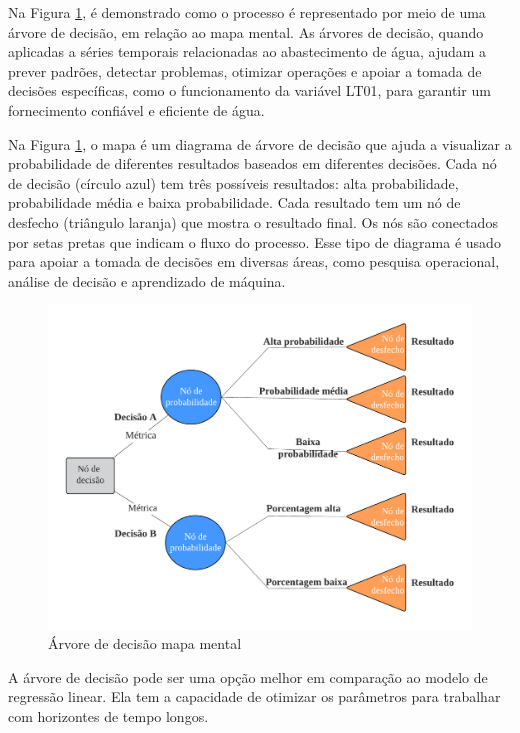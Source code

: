 Na Figura \ref{fig:arvore-de-decisao}, é demonstrado como o processo é representado por meio de uma árvore de decisão, em relação ao mapa mental. 
As árvores de decisão, quando aplicadas a séries temporais relacionadas ao abastecimento de água, ajudam a prever padrões, detectar problemas, otimizar operações e apoiar a tomada de decisões específicas, como o funcionamento da variável LT01, para garantir um fornecimento confiável e eficiente de água.

Na Figura \ref{fig:arvore-de-decisao}, o mapa é um diagrama de árvore de decisão que ajuda a visualizar a probabilidade de diferentes resultados baseados em diferentes decisões. Cada nó de decisão (círculo azul) tem três possíveis resultados: alta probabilidade, probabilidade média e baixa probabilidade. Cada resultado tem um nó de desfecho (triângulo laranja) que mostra o resultado final. Os nós são conectados por setas pretas que indicam o fluxo do processo. Esse tipo de diagrama é usado para apoiar a tomada de decisões em diversas áreas, como pesquisa operacional, análise de decisão e aprendizado de máquina.

\begin{figure}[H]
	\centering
	\caption{Árvore de decisão mapa mental}
	\label{fig:arvore-de-decisao}
	\includegraphics[width=\linewidth]{"Apendices/Figuras/modelagem-24h/Árvore de decisão"}
	

\end{figure}

A árvore de decisão pode ser uma opção melhor em comparação ao modelo de regressão linear. Ela tem a capacidade de otimizar os parâmetros para trabalhar com horizontes de tempo longos.

